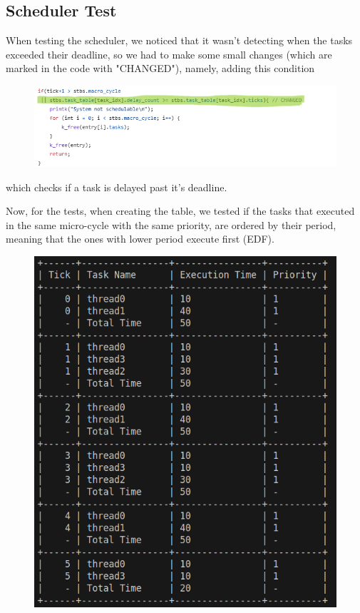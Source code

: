 \documentclass[a4paper,12pt]{article}
\begin{document}
\subsection{Scheduler Test}
When testing the scheduler, we noticed that it wasn't detecting when the tasks exceeded their deadline, so we had to make some small changes (which are marked in the code with "CHANGED"), namely, adding this condition
\begin{figure}[H]
    \centering
    \includegraphics[width=0.91\linewidth]{code_change.png}
    \label{fig:gantt}
\end{figure}

which checks if a task is delayed past it's deadline.

Now, for the tests, when creating the table, we tested if the tasks that executed in the same micro-cycle with the same priority, are ordered by their period, meaning that the ones with lower period execute first (EDF).
\begin{figure}[H]
    \centering
    \includegraphics[width=0.6\linewidth]{STBS_test_period.png}
    \label{fig:gantt}
\end{figure}
\end{document}
